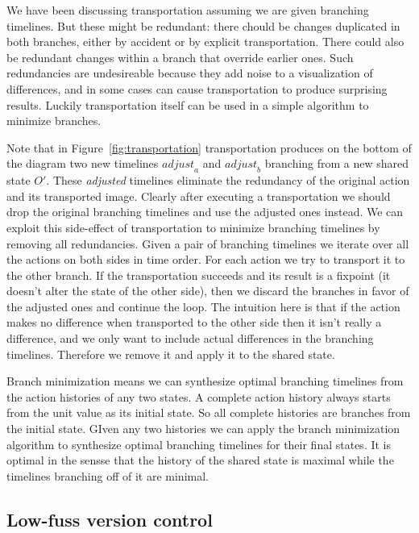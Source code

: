 \documentclass[english,submission]{programming}
\theoremstyle{definition}
\begin{document}
We have been discussing transportation assuming we are given branching timelines. But these might be redundant: there chould be changes duplicated in both branches, either by accident or by explicit transportation. There could also be redundant changes within a branch that override earlier ones. Such redundancies are undesireable because they add noise to a visualization of differences, and in some cases can cause transportation to produce surprising results. Luckily transportation itself can be used in a simple algorithm to minimize branches.

Note that in Figure~\ref{fig:transportation} transportation produces on the bottom of the diagram two new timelines $\mathit{adjust}_a$ and $\mathit{adjust}_b$ branching from a new shared state $O'$. These \textit{adjusted} timelines eliminate the redundancy of the original action and its transported image. Clearly after executing a transportation we should drop the original branching timelines and use the adjusted ones instead. We can exploit this side-effect of transportation to minimize branching timelines by removing all redundancies. Given a pair of branching timelines we iterate over all the actions on both sides in time order. For each action we try to transport it to the other branch. If the transportation succeeds and its result is a fixpoint (it doesn't alter the state of the other side), then we discard the branches in favor of the adjusted ones and continue the loop. The intuition here is that if the action makes no difference when transported to the other side then it isn't really a difference, and we only want to include actual differences in the branching timelines. Therefore we remove it and apply it to the shared state.

Branch minimization means we can synthesize optimal branching timelines from the action histories of any two states. A complete action history always starts from the unit value as its initial state. So all complete histories are branches from the initial state. GIven any two histories we can apply the branch minimization algorithm to synthesize optimal branching timelines for their final states. It is optimal in the sensse that the history of the shared state is maximal while the timelines branching off of it are minimal.

\subsection{Low-fuss version control}
\end{document}
